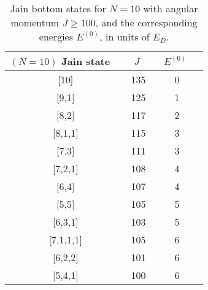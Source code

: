 \begin{table}
\caption{Jain bottom states for $N=10$ with
angular momentum $J \ge 100$, and the corresponding
energies $E^{(0)}$, in units of $E_D$.}
\label{tab6}
\vspace{0.4cm}
\begin{center}
\begin{tabular}{|c|c|c|} 
\hline
$(N=10)$ Jain state\ \ &  $J$\ \ & $E^{(0)}$\ \ \\ 
\hline
{[10]}    &   135 \   &   0 \ \\
{[9,1]}   &   125 \   &   1 \ \\
{[8,2] }  &   117 \   &   2 \ \\
\hline
{[8,1,1]} &   115  \  &   3 \ \\
{[7,3] }  &   111  \  &   3 \ \\
\hline
{[7,2,1]} &   108 \   &   4 \ \\
{[6,4] }  &   107 \   &   4 \ \\
\hline
{[5,5] }  &   105 \   &   5 \ \\
{[6,3,1]} &   103  \  &   5 \ \\
\hline
{[7,1,1,1]} &   105  \  &   6 \ \\
{[6,2,2]}   &   101  \  &   6 \ \\
{[5,4,1]}   &   100  \  &   6 \ \\
\hline
\end{tabular}
\end{center}
\end{table}

